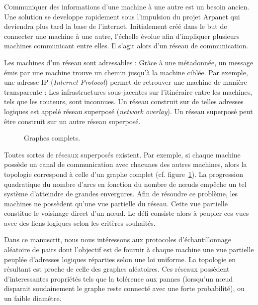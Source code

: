 
\lettrine{C}ommuniquer des informations d'une machine à une autre est un besoin
ancien. Une solution se developpe rapidement sous l'impulsion du projet Arpanet
qui deviendra plus tard la base de l'internet. Initialement créé dans le but de
connecter une machine à une autre, l'échelle évolue afin d'impliquer plusieurs
machines communicant entre elles. Il s'agit alors d'un réseau de communication.

Les machines d'un réseau sont adressables : Grâce à une métadonnée, un message
émis par une machine trouve un chemin jusqu'à la machine ciblée. Par exemple,
une adresse IP (\emph{Internet Protocol}) permet de retrouver une machine de
manière transparente : Les infrastructures sous-jacentes sur l'itinéraire entre
les machines, tels que les routeurs, sont inconnues. Un réseau construit sur de
telles adresses logiques est appelé réseau superposé (\emph{network
  overlay}). Un réseau superposé peut être construit sur un autre réseau
superposé.

\begin{figure}
  \begin{center}
    
    \caption[Graphes complets]{\label{net:fig:completegraph}Graphes complets.}
  \end{center}
\end{figure}

Toutes sortes de réseaux superposés existent. Par exemple, si chaque machine
possède un canal de communication avec chacunes des autres machines, alors la
topologie correspond à celle d'un graphe complet
(cf. figure~\ref{net:fig:completegraph}). La progression quadratique du nombre
d'arcs en fonction du nombre de nœuds empêche un tel système d'atteindre de
grandes envergures. Afin de résoudre ce problème, les machines ne possèdent
qu'une vue partielle du réseau. Cette vue partielle constitue le voisinage
direct d'un nœud. Le défi consiste alors à peupler ces vues avec des liens
logiques selon les critères souhaités.

Dans ce manuscrit, nous nous intéressons aux protocoles d'échantillonnage
aléatoire de pairs dont l'objectif est de fournir à chaque machine une vue
partielle peuplée d'adresses logiques réparties selon une loi uniforme. La
topologie en résultant est proche de celle des graphes aléatoires. Ces réseaux
possèdent d'interessantes propriétés tels que la tolérence aux pannes (lorsqu'un
nœud disparait soudainement le graphe reste connecté avec une forte
probabilité), ou un faible diamêtre.

